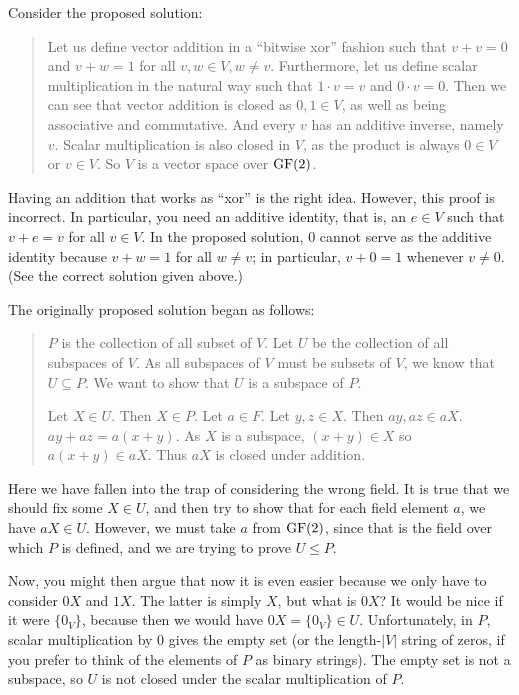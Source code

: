 \probskip

Consider the proposed solution:
\begin{quote}
Let us define vector addition in a ``bitwise xor'' fashion such that $v + v = 0$
and $v + w = 1$ for all $v,w \in V, w \neq v$. Furthermore, let us define scalar
multiplication in the natural way such that $1\cdot v = v$ and $0\cdot v = 0$.
Then we can see that vector addition is closed as $0,1 \in V$, as well as being
associative and commutative. And every $v$ has an additive inverse, namely
$v$. Scalar multiplication is also closed in $V$, as the product is always $0
\in V$ or $v \in V$. So $V$ is a vector space over $\operatorname{GF}(2)$.  
\end{quote}

\bigskip

 Having an addition that works as ``xor'' is the right idea.
However, this proof is incorrect.  In particular, you need an
additive identity, that is, an $e\in V$ such that $v + e = v$ for
all $v \in V$.  In the proposed solution, $0$ cannot serve as the additive identity
because $v+w = 1$ for all $w\neq v$; in particular, $v + 0 = 1$
whenever $v \neq 0$. (See the correct solution given above.)

\probskip

The originally proposed solution began as follows:
\begin{quote}
$P$ is the collection of all subset of $V$. Let $U$ be the collection of all subspaces of $V$. As all subspaces of $V$ must be subsets of $V$, we know that $U \subseteq P$. We want to show that $U$ is a subspace of $P$.

Let $X \in U$. Then $X \in P$. Let $a \in F$. Let $y,z \in X$.  Then $ay, az \in
aX$. $ay + az = a(x+y)$.  As $X$ is a subspace, $(x+y) \in X$ so $a(x+y) \in
aX$. Thus $aX$ is closed under addition.
\end{quote}

Here we have fallen into the trap of considering the wrong field.  It is true
that we should fix some $X \in U$, and then try to show that for each field
element $a$, we have $aX \in U$.  However, we must take $a$ from $\operatorname{GF}(2)$, since
that is the field over which $P$ is defined, and we are trying to prove $U\leq P$.

Now, you might then argue that now it is even easier because we only have to
consider $0X$ and $1X$. The latter is simply $X$, but what is $0X$?  It
would be nice if it were $\{0_V\}$, because then we would have $0X= \{0_V\} \in
U$.  Unfortunately, in $P$, scalar multiplication by 0 gives the empty set (or
the length-$|V|$ string of zeros, if you prefer to think of the
elements of $P$ as binary strings).  The empty set is not a subspace, so $U$ is
not closed under the scalar multiplication of $P$.







